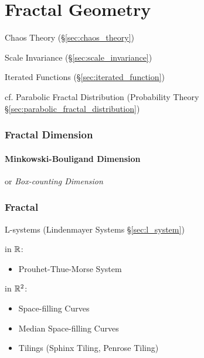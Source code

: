 \part{Fractal Geometry}\label{sec:fractal_geometry}

Chaos Theory (\S\ref{sec:chaos_theory})

Scale Invariance (\S\ref{sec:scale_invariance})

Iterated Functions (\S\ref{sec:iterated_function})

cf. Parabolic Fractal Distribution (Probability Theory
\S\ref{sec:parabolic_fractal_distribution})



\section{Fractal Dimension}\label{sec:fractal_dimension}

\subsection{Minkowski-Bouligand Dimension}
\label{sec:minkowski_bouligand}

or \emph{Box-counting Dimension}



\section{Fractal}\label{sec:fractal}

\asterism

L-systems (Lindenmayer Systems \S\ref{sec:l_system})


in $\mathbb{R}$:
\begin{itemize}
  \item Prouhet-Thue-Morse System
\end{itemize}

in $\mathbb{R}^2$:
\begin{itemize}
  \item Space-filling Curves
  \item Median Space-filling Curves
  \item Tilings (Sphinx Tiling, Penrose Tiling)
\end{itemize}
